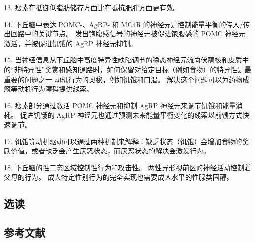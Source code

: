 13. 瘦素在抵御低脂肪储存方面比在抵抗肥胖方面更有效。 

14. 下丘脑中表达 POMC-、AgRP- 和 MC4R 的神经元是控制能量平衡的传入/传出回路中的关键节点。 发出饱腹感信号的神经元被促进饱腹感的 POMC 神经元激活，并被促进饥饿的 AgRP 神经元抑制。 

15. 当神经信息从下丘脑中高度特异性缺陷调节的稳态神经元流向伏隔核和皮质中的“非特异性”奖赏和感知通路时，如何保留对给定目标（例如食物）的特异性是最重要的问题之一 动机行为的奥秘，例如饥饿和口渴。 解决这个问题可以为药物成瘾等动机行为障碍提供线索。 

16. 瘦素部分通过激活 POMC 神经元和抑制 AgRP 神经元来调节饥饿和能量消耗。 促进饥饿的 AgRP 神经元也通过预测未来能量平衡变化的线索以前馈方式快速调节。 

17. 饥饿等动机驱动可以通过两种机制来解释：缺乏状态（饥饿）会增加食物的奖励价值，或者缺乏会产生厌恶状态，而厌恶状态的解决会激发行为。 

18. 下丘脑的性二态区域控制性行为和攻击性。 两性异形视前区的神经活动控制着父母的行为。 成人特定性别行为的完全实现也需要成人水平的性腺类固醇。

\subsection{选读}
\subsection{参考文献}